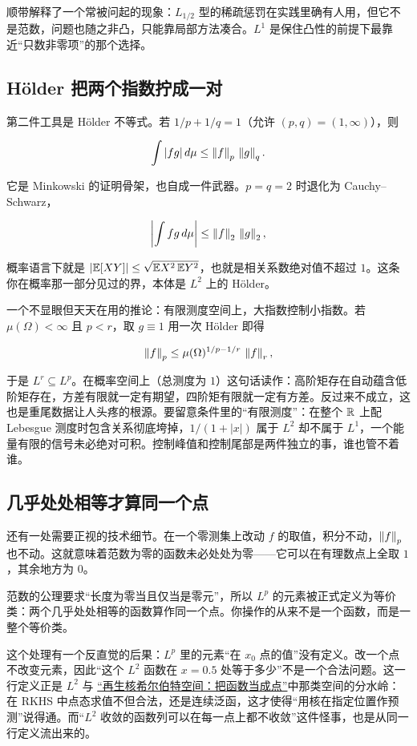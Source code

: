 顺带解释了一个常被问起的现象：\(L_{1/2}\) 型的稀疏惩罚在实践里确有人用，但它不是范数，问题也随之非凸，只能靠局部方法凑合。\(L^1\) 是保住凸性的前提下最靠近``只数非零项''的那个选择。

\subsection{\texorpdfstring{H\"older 把两个指数拧成一对}{Holder 把两个指数拧成一对}}

第二件工具是 H\"older 不等式。若 \(1/p+1/q=1\)（允许 \((p,q)=(1,\infty)\)），则

\[
\int|fg|\,d\mu\le\left\lVert f\right\rVert_p\,\left\lVert g\right\rVert_q .
\]

它是 Minkowski 的证明骨架，也自成一件武器。\(p=q=2\) 时退化为 Cauchy--Schwarz，

\[
\left|\int fg\,d\mu\right|\le\left\lVert f\right\rVert_2\,\left\lVert g\right\rVert_2 ,
\]

概率语言下就是 \(\left|\mathbb{E}[XY]\right|\le\sqrt{\mathbb{E} X^2\,\mathbb{E} Y^2}\)，也就是相关系数绝对值不超过 \(1\)。这条你在概率那一部分见过的界，本体是 \(L^2\) 上的 H\"older。

一个不显眼但天天在用的推论：有限测度空间上，大指数控制小指数。若 \(\mu(\Omega)<\infty\) 且 \(p<r\)，取 \(g\equiv1\) 用一次 H\"older 即得

\[
\left\lVert f\right\rVert_p\le\mu(\Omega)^{1/p-1/r}\,\left\lVert f\right\rVert_r ,
\]

于是 \(L^r\subseteq L^p\)。在概率空间上（总测度为 \(1\)）这句话读作：高阶矩存在自动蕴含低阶矩存在，方差有限就一定有期望，四阶矩有限就一定有方差。反过来不成立，这也是重尾数据让人头疼的根源。要留意条件里的``有限测度''：在整个 \(\mathbb{R}\) 上配 Lebesgue 测度时包含关系彻底垮掉，\(1/(1+|x|)\) 属于 \(L^2\) 却不属于 \(L^1\)，一个能量有限的信号未必绝对可积。控制峰值和控制尾部是两件独立的事，谁也管不着谁。

\subsection{几乎处处相等才算同一个点}

还有一处需要正视的技术细节。在一个零测集上改动 \(f\) 的取值，积分不动，\(\left\lVert f\right\rVert_p\) 也不动。这就意味着范数为零的函数未必处处为零——它可以在有理数点上全取 \(1\)，其余地方为 \(0\)。

范数的公理要求``长度为零当且仅当是零元''，所以 \(L^p\) 的元素被正式定义为等价类：两个几乎处处相等的函数算作同一个点。你操作的从来不是一个函数，而是一整个等价类。

这个处理有一个反直觉的后果：\(L^p\) 里的元素``在 \(x_0\) 点的值''没有定义。改一个点不改变元素，因此``这个 \(L^2\) 函数在 \(x=0.5\) 处等于多少''不是一个合法问题。这一行定义正是 \(L^2\) 与 \hyperref[sec:13-Machine-Learning/09-Kernel-Methods-and-Gaussian-Processes/03]{``再生核希尔伯特空间：把函数当成点''}中那类空间的分水岭：在 RKHS 中点态求值不但合法，还是连续泛函，这才使得``用核在指定位置作预测''说得通。而``\(L^2\) 收敛的函数列可以在每一点上都不收敛''这件怪事，也是从同一行定义流出来的。

